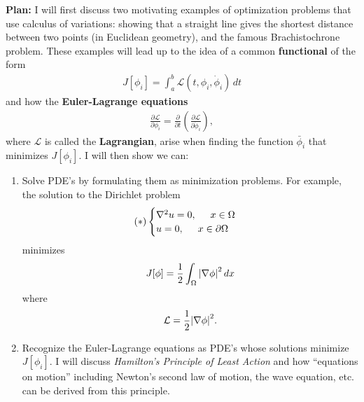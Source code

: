 \documentclass{article}
\theoremstyle{definition}
\newcommand{\p}{\partial}
\newcommand{\lag}{\mathcal{L}}
\newcommand{\f}[2]{\frac{#1}{#2}}
\newcommand{\lp}{\left(}
\newcommand{\rp}{\right)}
\begin{document}
\noindent \textbf{Plan:} I will first discuss two motivating examples of optimization problems that use calculus of variations: showing that a straight line gives the shortest distance between two points (in Euclidean geometry), and the famous Brachistochrone problem. These examples will lead up to the idea of a common \textbf{functional} of the form
\begin{align*}
J[\phi_i] = \int^b_a \lag(t,\phi_i,\dot{\phi}_i)\,dt
\end{align*}
and how the \textbf{Euler-Lagrange equations}
\begin{align*}
\f{\p \lag }{\p \phi_i} = \f{\p}{\p t} \lp\f{\p \lag}{\p \dot{\phi}_i}\rp,
\end{align*}
where $\lag$ is called the \textbf{Lagrangian}, arise when finding the function $\bar{\phi}_i$ that minimizes $J[\phi_i]$. I will then show we can:
\begin{enumerate}
	\item Solve PDE's by formulating them as minimization problems. For example, the solution to the Dirichlet problem 
	\begin{align*}
	(\ast) \begin{cases}
	\nabla^2u = 0, \hspace{0.5cm}  \text{$x\in \Omega$}\\
	u = 0, \hspace{0.5cm} \text{$x \in \p \Omega$}
	\end{cases}
	\end{align*}
	minimizes 
	\begin{align*}
	J[\phi] = \f{1}{2}\int_\Omega \abs{\nabla \phi}^2\,dx
	\end{align*}
	where
	\begin{align*}
	\lag = \f{1}{2}\abs{\nabla \phi}^2.
	\end{align*}
	\item Recognize the Euler-Lagrange equations as PDE's whose solutions minimize $J[\phi_i]$. I will discuss \textit{Hamilton's Principle of Least Action} and how ``equations on motion'' including Newton's second law of motion, the wave equation, etc. can be derived from this principle. 
\end{enumerate}



\end{document}

